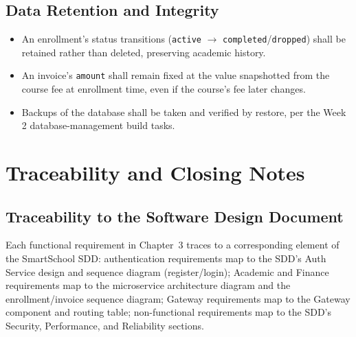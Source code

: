 \documentclass[11pt,a4paper]{report}
\newcommand{\sysname}{SmartSchool}
\begin{document}
\section{Data Retention and Integrity}
\begin{itemize}[itemsep=2pt]
    \item An enrollment's status transitions (\texttt{active} $\rightarrow$ \texttt{completed}/\texttt{dropped}) shall be retained rather than deleted, preserving academic history.
    \item An invoice's \texttt{amount} shall remain fixed at the value snapshotted from the course fee at enrollment time, even if the course's fee later changes.
    \item Backups of the database shall be taken and verified by restore, per the Week 2 database-management build tasks.
\end{itemize}

\chapter{Traceability and Closing Notes}

\section{Traceability to the Software Design Document}
Each functional requirement in Chapter~3 traces to a corresponding element
of the \sysname{} SDD: authentication requirements map to the SDD's Auth
Service design and sequence diagram (register/login); Academic and Finance
requirements map to the microservice architecture diagram and the
enrollment/invoice sequence diagram; Gateway requirements map to the
Gateway component and routing table; non-functional requirements map to the
SDD's Security, Performance, and Reliability sections.
\end{document}
